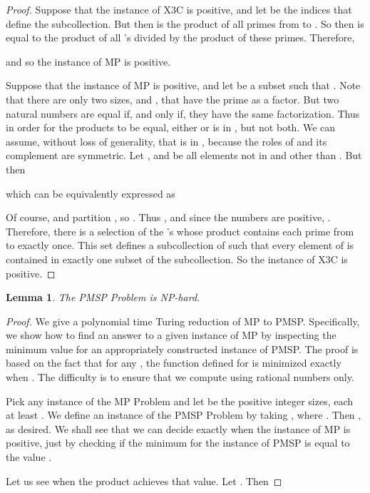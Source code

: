 \documentclass[letterpaper,11pt]{article}
\newtheorem{lemma}[theorem]{Lemma}
\begin{document}
{\begin{proof}
Suppose that the instance of X3C is positive, and let  be the indices that define the subcollection. But then  is the product of all primes from  to . So then  is equal to the product of all 's divided by the product of these primes. Therefore,

and so the instance of MP is positive.


Suppose that the instance of MP is positive, and let  be a subset such that . Note that there are only two sizes,  and , that have the prime  as a factor. But two natural numbers are equal if, and only if, they have the same factorization. Thus in order for the products to be equal, either  or  is in , but not both. We can assume, without loss of generality, that  is in , because the roles of  and its complement are symmetric. Let , and  be all elements not in  and other than . But then 

which can be equivalently expressed as

Of course,  and  partition , so . Thus
, and since the numbers are positive, . Therefore, there is a selection of the 's whose product contains each prime from  to  exactly once. This set  defines a subcollection of  such that every element of  is contained in exactly one subset of the subcollection. So the instance of X3C is positive.
\end{proof}


\renewcommand{\thetheorem}{4.2}

\begin{lemma}
The PMSP Problem is NP-hard.
\end{lemma}

\begin{proof}
We give a polynomial time Turing reduction of MP to PMSP. Specifically, we show how to find an answer to a given instance of MP by inspecting the minimum value for an appropriately constructed instance of PMSP. The proof is based on the fact that for any , the function  defined for  is minimized exactly when . The difficulty is to ensure that we compute using rational numbers only.

Pick any instance of the MP Problem and let  be the positive integer sizes, each at least . We define an instance of the PMSP Problem by taking , where . Then , as desired. 
We shall see that we can decide exactly when the instance of MP is positive, just by checking if the minimum for the instance of PMSP is equal to the value .

Let us see when the product  achieves that value. Let . Then


\end{proof}}
\end{document}
